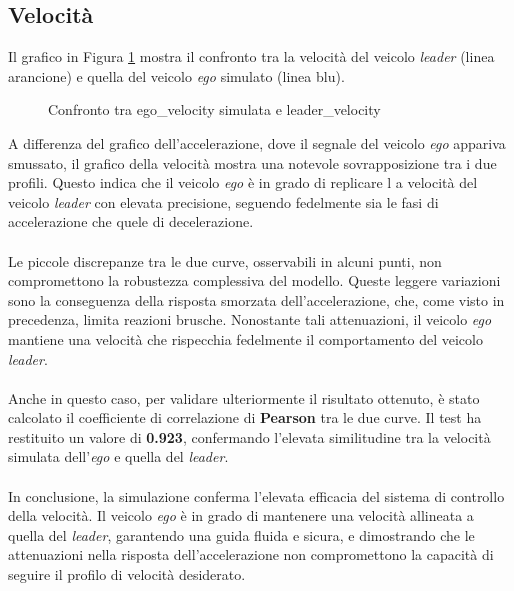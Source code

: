 \subsection{Velocità}
Il grafico in Figura \ref{fig:vel_leader_ego} mostra il confronto tra la velocità del veicolo \emph{leader} 
(linea arancione) e quella del veicolo \emph{ego} simulato (linea blu).
\begin{figure}[H]
    \centering
    \caption{Confronto tra ego\_velocity simulata e leader\_velocity}
    \label{fig:vel_leader_ego}
\end{figure}
\noindent A differenza del grafico dell'accelerazione, dove il segnale del veicolo \emph{ego} appariva smussato, il grafico della 
velocità mostra una notevole sovrapposizione tra i due profili. Questo indica che il veicolo \emph{ego} è in grado di replicare l
a velocità del veicolo \emph{leader} con elevata precisione, seguendo fedelmente sia le fasi di accelerazione che quele di decelerazione.
\\\\
\noindent Le piccole discrepanze tra le due curve, osservabili in alcuni punti, non compromettono la robustezza complessiva del modello. 
Queste leggere variazioni sono la conseguenza della risposta smorzata dell'accelerazione, che, come visto in precedenza, 
limita reazioni brusche. Nonostante tali attenuazioni, il veicolo \emph{ego} mantiene una velocità che rispecchia fedelmente 
il comportamento del veicolo \emph{leader}.
\\\\
\noindent Anche in questo caso, per validare ulteriormente il risultato ottenuto, è stato calcolato il coefficiente di correlazione 
di \textbf{Pearson} tra le due curve. Il test ha restituito un valore di \textbf{0.923}, confermando l'elevata similitudine tra la 
velocità simulata dell'\emph{ego} e quella del \emph{leader}.
\\\\
\noindent In conclusione, la simulazione conferma l'elevata efficacia del sistema di controllo della velocità. Il veicolo \emph{ego}
è in grado di mantenere una velocità allineata a quella del \emph{leader}, garantendo una guida fluida e sicura, 
e dimostrando che le attenuazioni nella risposta dell'accelerazione non compromettono la capacità di seguire il profilo di velocità 
desiderato.
